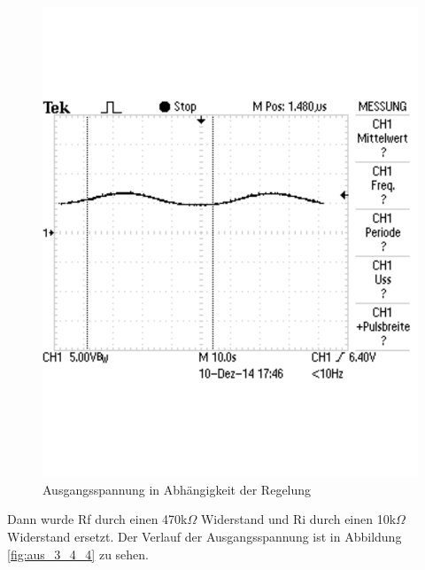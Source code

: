 \documentclass[12pt,a4paper]{article}
\begin{document}
\begin{figure}[H] 
  \centering
    \includegraphics[trim = 0mm 50mm 0mm 50mm, clip, scale = 0.6]{TEK0009.pdf}
  	\caption[Ausgangsspannung in Abhängigkeit der Regelung]{Ausgangsspannung in Abhängigkeit der Regelung}
  \label{fig:aus_3_4_3}
\end{figure}

Dann wurde Rf durch einen 470k$\Omega$ Widerstand und Ri durch einen 10k$\Omega$ Widerstand ersetzt. Der Verlauf der Ausgangsspannung ist in Abbildung \ref{fig:aus_3_4_4} zu sehen.
\end{document}
